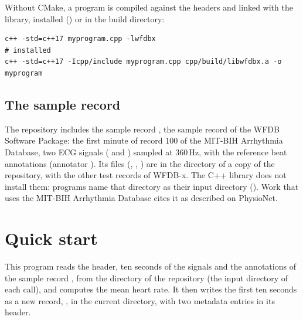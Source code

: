 Without CMake, a program is compiled against the headers and linked with the library,
installed () or in the build directory:

\begin{lstlisting}[style=shell]
c++ -std=c++17 myprogram.cpp -lwfdbx                                  # installed
c++ -std=c++17 -Icpp/include myprogram.cpp cpp/build/libwfdbx.a -o myprogram
\end{lstlisting}

\subsection{The sample record}
\label{sec:cpp-resources}

The repository includes the sample record , the sample record of the WFDB
Software Package: the first minute of record 100 of the MIT-BIH Arrhythmia Database, two
ECG signals ( and ) sampled at 360\,Hz, with the reference beat
annotations (annotator ). Its files (, ,
) are in the directory  of a copy of the repository, with
the other test records of WFDB-x. The C++ library does not install them: programs name
that directory as their input directory ().
Work that uses the MIT-BIH Arrhythmia Database cites it as described on PhysioNet.

\section{Quick start}
\label{sec:cpp-quickstart}

This program reads the header, ten seconds of the signals and the annotations of the
sample record , from the directory  of the repository (the
input directory of each call), and computes the mean heart rate. It then writes the first
ten seconds as a new record, , in the current directory, with two metadata
entries in its header.

